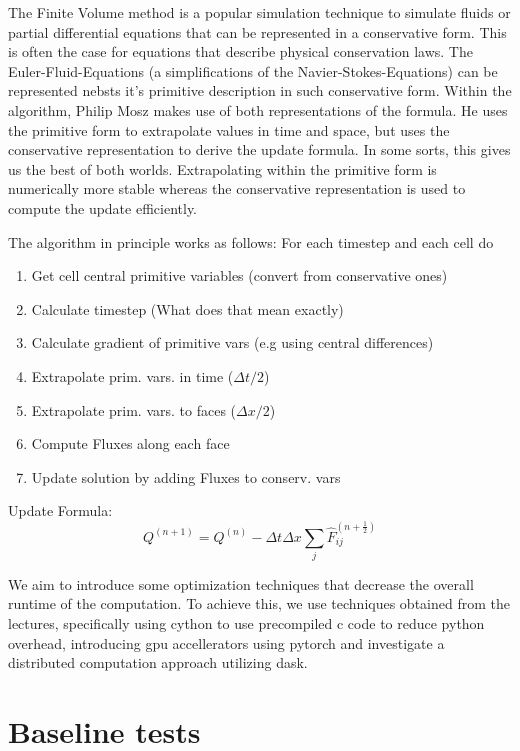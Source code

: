 \documentclass[a4paper,10pt]{article}
\begin{document}
The Finite Volume method is a popular simulation technique to simulate fluids or partial differential equations that can be represented in a conservative form.
This is often the case for equations that describe physical conservation laws.
The Euler-Fluid-Equations (a simplifications of the Navier-Stokes-Equations) can be represented nebsts it's primitive description in such conservative form.
Within the algorithm, Philip Mosz makes use of both representations of the formula.
He uses the primitive form to extrapolate values in time and space, but uses the conservative representation to derive the update formula.
In some sorts, this gives us the best of both worlds.
Extrapolating within the primitive form is numerically more stable whereas the conservative representation is used to compute the update efficiently.

The algorithm in principle works as follows:
For each timestep and each cell do
\begin{enumerate}
  \item Get cell central primitive variables (convert from conservative ones)
  \item Calculate timestep (What does that mean exactly)
  \item Calculate gradient of primitive vars (e.g using central differences)
  \item Extrapolate prim. vars. in time ($\Delta t / 2$)
  \item Extrapolate prim. vars. to faces ($\Delta x / 2$)
  \item Compute Fluxes along each face
  \item Update solution by adding Fluxes to conserv. vars
\end{enumerate}

Update Formula:
\begin{equation}
Q^{(n+1)} = Q^{(n)} - \Delta t \Delta x \sum_{j} \hat{F}_{ij}^{(n + \frac{1}{2})}
\end{equation}

We aim to introduce some optimization techniques that decrease the overall runtime of the computation.
To achieve this, we use techniques obtained from the lectures, specifically using cython to use precompiled c code to reduce python overhead,
introducing gpu accellerators using pytorch and investigate a distributed computation approach utilizing dask.

\section{Baseline tests}
\end{document}
